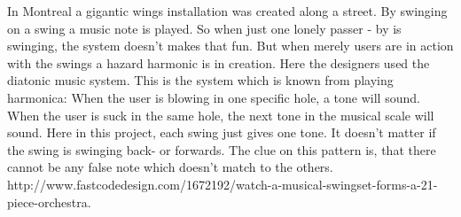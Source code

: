 In Montreal a gigantic wings installation was created along a street.\newline
By swinging on a swing a music note is played. So when just one lonely passer - by is swinging, the system doesn't makes that fun. But when merely users are in action with the swings a hazard harmonic is in creation. \newline
Here the designers used the diatonic music system. This is the system which is known from playing harmonica: When the user is blowing in one specific hole, a tone will sound. When the user is suck in the same hole, the next tone in the musical scale will sound. Here in this project, each swing just gives one tone. It doesn't matter if the swing is swinging back- or forwards. The clue on this pattern is, that there cannot be any false note which doesn't match to the others.\newline
\newline
http://www.fastcodedesign.com/1672192/watch-a-musical-swingset-forms-a-21-piece-orchestra.                
